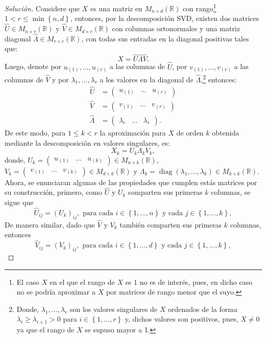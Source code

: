 \documentclass[10.5pt,notitlepage]{article}
\newenvironment{solucion}
  {\begin{proof}[Solución]}
  {\end{proof}}
\DeclareMathOperator{\diag}{diag}
\newcommand{\RR}{\mathbb{R}}
\newcommand{\kis}[1]{\left\{ #1 \right\}}
\newcommand{\Matrix}[1]{\begin{pmatrix} #1 \end{pmatrix}}
\theoremstyle{plain}
\begin{document}
\begin{solucion}
Considere que \(X\) es una matriz en \(M_{n \times d}(\RR)\) con rango\footnote{El caso \(X\) en el que el rango de \(X\) es \(1\) no es de interés, pues, en dicho caso no se podría aproximar a \(X\) por matrices de rango menor que el suyo.} \(1 < r \leq \min\kis{n,d}\), entonces, por la descomposición SVD, existen dos matrices \(\hat{U}\in M_{n \times r}(\RR)\) y \(\hat{V} \in M_{d \times r}(\RR)\) con columnas ortonormales y una matriz diagonal \(\hat{\Lambda} \in M_{r \times r}(\RR)\), con todas sus entradas en la diagonal positivas tales que:
\[
X = \hat{U} \hat{\Lambda} \hat{V}. 
\]
Luego, denote por \(u_{(1)}, \hdots, u_{(r)}\) a las columnas de \(\hat{U}\), por \(v_{(1)}, \hdots, v_{(r)}\) a las columnas de \(\hat{V}\) y por \(\lambda_1, \hdots, \lambda_r\) a los valores en la diagonal de \(\hat{\Lambda}\),\footnote{Donde, \(\lambda_1, \hdots, \lambda_r\) son los valores singulares de \(X\) ordenados de la forma \(\lambda_i \geq\lambda_{i+1}  >0\) para \(i \in \kis{1, \hdots, r}\) y, dichos valores son positivos, pues, \(X \neq 0\) ya que el rango de \(X\) se supuso mayor a 1.} entonces: 
\begin{align*}
    \hat{U} &= \Matrix{u_{(1)} & \hdots & u_{(r)} }\\ 
    \hat{V} &= \Matrix{v_{(1)} & \hdots &v_{(r)} }\\
    \hat{\Lambda} &= \Matrix{\lambda_{r} & \hdots &\lambda_{r}}.
\end{align*}
De este modo, para \(1 \leq k < r\) la aproximación para \(X\) de orden \(k\) obtenida mediante la descomposición en valores singulares, es:
\[
X_{k} = U_{k}\Lambda_{k}V_{k},
\]
donde, \(U_{k} =  \Matrix{u_{(1)} & \hdots & u_{(k)}} \in M_{n \times k}(\RR)\), \(V_{k}=\Matrix{v_{(1)} & \hdots & v_{(k)}}\in M_{d \times k}(\RR)\) y \(\Lambda_{k} = \diag(\lambda_{1}, \hdots, \lambda_{k})\in M_{k \times k}(\RR)\). Ahora, se enunciaran algunas de las propiedades que cumplen estás matrices por su construcción, primero, como \(\hat{U}\) y \(U_{k}\) comparten sus primeras \(k\) columnas, se sigue que 
\begin{equation}\label{lab.1}
    \hat{U}_{ij} = (U_{k})_{ij}, \text{ para cada } i \in \kis{1, \hdots, n} \text{ y cada } j \in \kis{1, \hdots, k},
\end{equation}
De manera similar, dado que \(\hat{V}\) y \(V_{k}\) también comparten sus primeras \(k\) columnas, entonces 
\begin{equation}\label{lab.2}
    \hat{V}_{ij} = (V_{k})_{ij}, \text{ para cada } i \in \kis{1, \hdots, d} \text{ y cada } j \in \kis{1, \hdots, k},

\end{equation}
\end{solucion}
\end{document}
